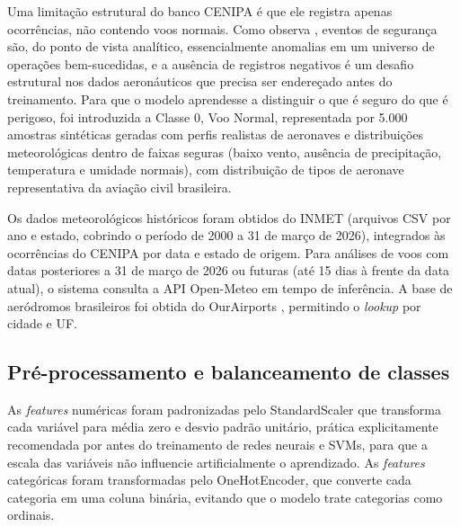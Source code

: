 \documentclass[english,brazilian]{UNISINOSartigo}
\begin{document}
Uma limitação estrutural do banco CENIPA é que ele registra apenas ocorrências,
não contendo voos normais. Como observa , eventos de
segurança são, do ponto de vista analítico, essencialmente anomalias em um
universo de operações bem-sucedidas, e a ausência de registros negativos é um
desafio estrutural nos dados aeronáuticos que precisa ser endereçado antes do
treinamento. Para que o modelo aprendesse a distinguir o que é seguro do que é
perigoso, foi introduzida a Classe 0, Voo Normal, representada por
5.000 amostras sintéticas geradas com perfis realistas de aeronaves e
distribuições meteorológicas dentro de faixas seguras (baixo vento, ausência de
precipitação, temperatura e umidade normais), com distribuição de tipos de
aeronave representativa da aviação civil brasileira.

Os dados meteorológicos históricos foram obtidos do INMET \cite{INMET2024}
(arquivos CSV por ano e estado, cobrindo o período de 2000 a 31 de março de
2026), integrados às ocorrências do CENIPA por data e estado de origem. Para
análises de voos com datas posteriores a 31 de março de 2026 ou futuras (até
15 dias à frente da data atual), o sistema consulta a API
Open-Meteo \cite{OPENMETEO2026} em tempo de inferência. A base de aeródromos
brasileiros foi obtida do OurAirports \cite{OURAIRPORTS2026}, permitindo o
\textit{lookup} por cidade e UF.

\subsection{Pré-processamento e balanceamento de classes}

As \textit{features} numéricas foram padronizadas pelo StandardScaler
\cite{SCIKITLEARN2026} que transforma cada variável para média zero e desvio
padrão unitário, prática explicitamente recomendada por 
antes do treinamento de redes neurais e SVMs, para que a escala das variáveis
não influencie artificialmente o aprendizado. As \textit{features} categóricas
foram transformadas pelo OneHotEncoder, que converte cada categoria em
uma coluna binária, evitando que o modelo trate categorias como ordinais.
\end{document}
